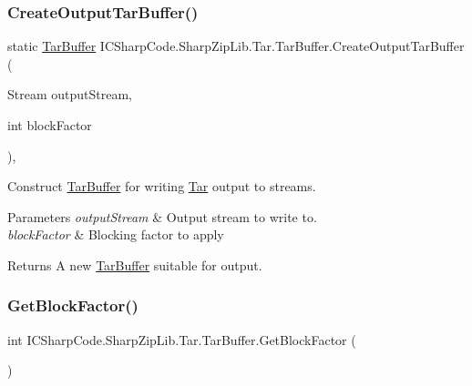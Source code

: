 \subsubsection{\texorpdfstring{Create\+Output\+Tar\+Buffer()}{CreateOutputTarBuffer()}\hspace{0.1cm}{\footnotesize\ttfamily [2/2]}}
{\footnotesize\ttfamily static \hyperlink{class_i_c_sharp_code_1_1_sharp_zip_lib_1_1_tar_1_1_tar_buffer}{Tar\+Buffer} I\+C\+Sharp\+Code.\+Sharp\+Zip\+Lib.\+Tar.\+Tar\+Buffer.\+Create\+Output\+Tar\+Buffer (\begin{DoxyParamCaption}\item[{Stream}]{output\+Stream,  }\item[{int}]{block\+Factor }\end{DoxyParamCaption})\hspace{0.3cm}{\ttfamily [inline]}, {\ttfamily [static]}}



Construct \hyperlink{class_i_c_sharp_code_1_1_sharp_zip_lib_1_1_tar_1_1_tar_buffer}{Tar\+Buffer} for writing \hyperlink{namespace_i_c_sharp_code_1_1_sharp_zip_lib_1_1_tar}{Tar} output to streams. 


\begin{DoxyParams}{Parameters}
{\em output\+Stream} & Output stream to write to.\\
\hline
{\em block\+Factor} & Blocking factor to apply\\
\hline
\end{DoxyParams}
\begin{DoxyReturn}{Returns}
A new \hyperlink{class_i_c_sharp_code_1_1_sharp_zip_lib_1_1_tar_1_1_tar_buffer}{Tar\+Buffer} suitable for output.
\end{DoxyReturn}
\mbox{\label{class_i_c_sharp_code_1_1_sharp_zip_lib_1_1_tar_1_1_tar_buffer_ad6a7ea52f703433c37da286520e6f3e0}} 
\subsubsection{\texorpdfstring{Get\+Block\+Factor()}{GetBlockFactor()}}
{\footnotesize\ttfamily int I\+C\+Sharp\+Code.\+Sharp\+Zip\+Lib.\+Tar.\+Tar\+Buffer.\+Get\+Block\+Factor (\begin{DoxyParamCaption}{ }\end{DoxyParamCaption})\hspace{0.3cm}{\ttfamily [inline]}}



